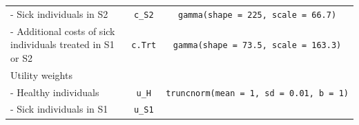 \documentclass[]{book}
\begin{document}
\begin{longtable}[]{@{}lcc@{}}
\begin{minipage}[t]{0.43\columnwidth}\raggedright\strut
- Sick individuals in S2\strut
\end{minipage} & \begin{minipage}[t]{0.18\columnwidth}\centering\strut
\texttt{c\_S2}\strut
\end{minipage} & \begin{minipage}[t]{0.20\columnwidth}\centering\strut
\texttt{gamma(shape\ =\ 225,\ scale\ =\ 66.7)}\strut
\end{minipage}\tabularnewline
\begin{minipage}[t]{0.43\columnwidth}\raggedright\strut
- Additional costs of sick individuals treated in S1 or S2\strut
\end{minipage} & \begin{minipage}[t]{0.18\columnwidth}\centering\strut
\texttt{c.Trt}\strut
\end{minipage} & \begin{minipage}[t]{0.20\columnwidth}\centering\strut
\texttt{gamma(shape\ =\ 73.5,\ scale\ =\ 163.3)}\strut
\end{minipage}\tabularnewline
\begin{minipage}[t]{0.43\columnwidth}\raggedright\strut
Utility weights\strut
\end{minipage} & \begin{minipage}[t]{0.18\columnwidth}\centering\strut
\strut
\end{minipage} & \begin{minipage}[t]{0.20\columnwidth}\centering\strut
\strut
\end{minipage}\tabularnewline
\begin{minipage}[t]{0.43\columnwidth}\raggedright\strut
- Healthy individuals\strut
\end{minipage} & \begin{minipage}[t]{0.18\columnwidth}\centering\strut
\texttt{u\_H}\strut
\end{minipage} & \begin{minipage}[t]{0.20\columnwidth}\centering\strut
\texttt{truncnorm(mean\ =\ 1,\ sd\ =\ 0.01,\ b\ =\ 1)}\strut
\end{minipage}\tabularnewline
\begin{minipage}[t]{0.43\columnwidth}\raggedright\strut
- Sick individuals in S1\strut
\end{minipage} & \begin{minipage}[t]{0.18\columnwidth}\centering\strut
\texttt{u\_S1}\strut
\end{minipage} & \begin{minipage}[t]{0.20\columnwidth}\centering\strut

\end{minipage}
\end{longtable}
\end{document}
